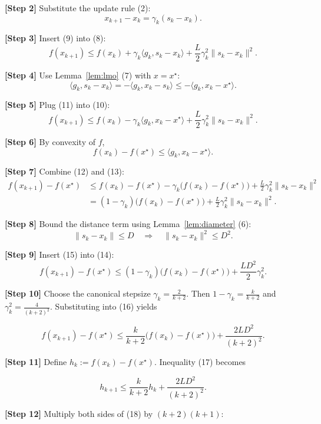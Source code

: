 \documentclass{article}
\begin{document}
\noindent\textbf{[Step 2]} Substitute the update rule (2):
\[
x_{k+1}-x_k = \gamma_k(s_k-x_k).
\tag{9}
\]

\noindent\textbf{[Step 3]} Insert (9) into (8):
\[
f(x_{k+1})\le f(x_k)+\gamma_k\langle g_k, s_k-x_k\rangle
      +\frac{L}{2}\gamma_k^{2}\|s_k-x_k\|^{2}.
\tag{10}
\]

\noindent\textbf{[Step 4]} Use Lemma~\ref{lem:lmo} (7) with $x=x^\star$:
\[
\langle g_k, s_k-x_k\rangle
= -\langle g_k, x_k-s_k\rangle
\le -\langle g_k, x_k-x^\star\rangle .
\tag{11}
\]

\noindent\textbf{[Step 5]} Plug (11) into (10):
\[
f(x_{k+1})\le f(x_k)-\gamma_k\langle g_k, x_k-x^\star\rangle
            +\frac{L}{2}\gamma_k^{2}\|s_k-x_k\|^{2}.
\tag{12}
\]

\noindent\textbf{[Step 6]} By convexity of $f$,
\[
f(x_k)-f(x^\star)\le \langle g_k, x_k-x^\star\rangle .
\tag{13}
\]

\noindent\textbf{[Step 7]} Combine (12) and (13):
\[
\begin{aligned}
f(x_{k+1})-f(x^\star)
&\le f(x_k)-f(x^\star)
   -\gamma_k\bigl(f(x_k)-f(x^\star)\bigr)
   +\frac{L}{2}\gamma_k^{2}\|s_k-x_k\|^{2}\\[1mm]
&= (1-\gamma_k)\bigl(f(x_k)-f(x^\star)\bigr)
   +\frac{L}{2}\gamma_k^{2}\|s_k-x_k\|^{2}.
\end{aligned}
\tag{14}
\]

\noindent\textbf{[Step 8]} Bound the distance term using Lemma~\ref{lem:diameter} (6):
\[
\|s_k-x_k\|\le D\quad\Longrightarrow\quad
\|s_k-x_k\|^{2}\le D^{2}.
\tag{15}
\]

\noindent\textbf{[Step 9]} Insert (15) into (14):
\[
f(x_{k+1})-f(x^\star)\le (1-\gamma_k)\bigl(f(x_k)-f(x^\star)\bigr)
    +\frac{L D^{2}}{2}\gamma_k^{2}.
\tag{16}
\]

\noindent\textbf{[Step 10]} Choose the canonical stepsize $\displaystyle\gamma_k=\frac{2}{k+2}$.
Then $1-\gamma_k = \frac{k}{k+2}$ and $\gamma_k^{2}= \frac{4}{(k+2)^{2}}$.  
Substituting into (16) yields

\[
f(x_{k+1})-f(x^\star)\le
\frac{k}{k+2}\bigl(f(x_k)-f(x^\star)\bigr)
+\frac{2L D^{2}}{(k+2)^{2}}.
\tag{17}
\]

\noindent\textbf{[Step 11]} Define $h_k:=f(x_k)-f(x^\star)$.  
Inequality (17) becomes

\[
h_{k+1}\le\frac{k}{k+2}h_k+\frac{2L D^{2}}{(k+2)^{2}}.
\tag{18}
\]

\noindent\textbf{[Step 12]} Multiply both sides of (18) by $(k+2)(k+1)$:
\end{document}
